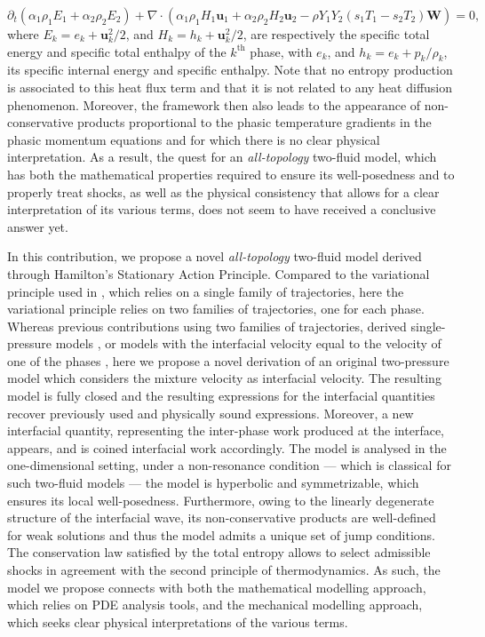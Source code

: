 \documentclass{myclass}
\newcommand{\vel}{\bm{u}}
\newcommand{\pth}[1]  {\left( #1 \right)}
\begin{document}
\begin{equation}
\partial_t\pth{\alpha_1\rho_1 E_1 + \alpha_2 \rho_2 E_2} + \nabla\cdot\pth{\alpha_1\rho_1 H_1 \vel_1 + \alpha_2 \rho_2 H_2 \vel_2 - \rho Y_1 Y_2 (s_1 T_1 - s_2 T_2)\bm{W}} = 0,\label{eq:artificial_heat_SHTC}
\end{equation}
where $E_k=e_k+\vel_k^2/2$, and $H_k=h_k+\vel_k^2/2$, are respectively the specific total energy and specific total enthalpy of the $k^\text{th}$ phase, with $e_k$, and $h_k=e_k + p_k/\rho_k$, its specific internal energy and specific enthalpy. Note that no entropy production is associated to this heat flux term and that it is not related to any heat diffusion phenomenon. Moreover, the framework then also leads to the appearance of non-conservative products proportional to the phasic temperature gradients in the phasic momentum equations and for which there is no clear physical interpretation. As a result, the quest for an \textit{all-topology} two-fluid model, which has both the mathematical properties required to ensure its well-posedness and to properly treat shocks, as well as the physical consistency that allows for a clear interpretation of its various terms, does not seem to have received a conclusive answer yet. 

In this contribution, we propose a novel \textit{all-topology} two-fluid model derived through Hamilton's Stationary Action Principle. Compared to the variational principle used in \cite{haegeman_RelVel:2025}, which relies on a single family of trajectories, here the variational principle relies on two families of trajectories, one for each phase. Whereas previous contributions using two families of trajectories, derived single-pressure models \cite{bedford:1978,geurst:1986}, or models with the interfacial velocity equal to the velocity of one of the phases \cite{gavrilyuk:2002}, here we propose a novel derivation of an original two-pressure model which considers the mixture velocity as interfacial velocity. The resulting model is fully closed and the resulting expressions for the interfacial quantities recover previously used and physically sound expressions. Moreover, a new interfacial quantity, representing the inter-phase work produced at the interface, appears, and is coined interfacial work accordingly. The model is analysed in the one-dimensional setting, under a non-resonance condition --- which is classical for such two-fluid models \cite{ransom:1984,gallouet:2004} --- the model is hyperbolic and symmetrizable, which ensures its local well-posedness. Furthermore, owing to the linearly degenerate structure of the interfacial wave, its non-conservative products are well-defined for weak solutions and thus the model admits a unique set of jump conditions. The conservation law satisfied by the total entropy allows to select admissible shocks in agreement with the second principle of thermodynamics. As such, the model we propose connects with both the mathematical modelling approach, which relies on PDE analysis tools, and the mechanical modelling approach, which seeks clear physical interpretations of the various terms.
\end{document}
